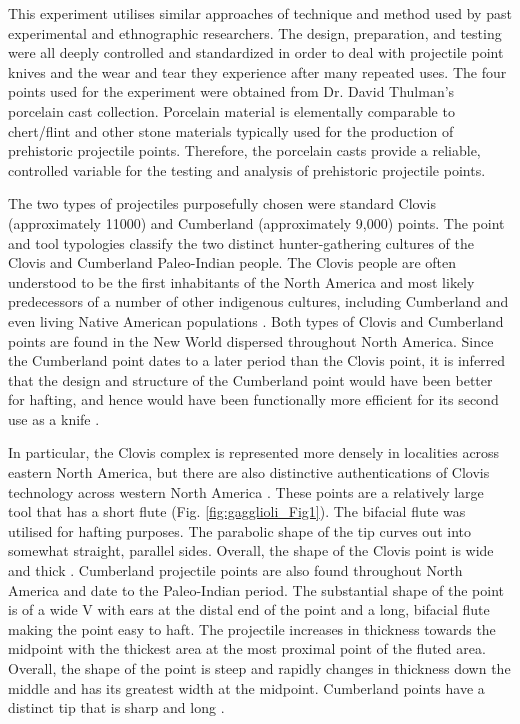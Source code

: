 	 This experiment utilises similar approaches of technique and method used by past experimental and ethnographic researchers. The design, preparation, and testing were all deeply controlled and standardized in order to deal with projectile point knives and the wear and tear they experience after many repeated uses. The four points used for the experiment were obtained from Dr. David Thulman’s porcelain cast collection. Porcelain material is elementally comparable to chert/flint and other stone materials typically used for the production of prehistoric projectile points. Therefore, the porcelain casts provide a reliable, controlled variable for the testing and analysis of prehistoric projectile points. 
	 
	 The two types of projectiles purposefully chosen were standard Clovis (approximately 11000\BC) and Cumberland (approximately 9,000\BC) points. The point and tool typologies classify the two distinct hunter-gathering cultures of the Clovis and Cumberland Paleo-Indian people. The Clovis people are often understood to be the first inhabitants of the North America and most likely predecessors of a number of other indigenous cultures, including Cumberland and even living Native American populations \parencite{Haynes_2002}. Both types of Clovis and Cumberland points are found in the New World dispersed throughout North America. Since the Cumberland point dates to a later period than the Clovis point, it is inferred that the design and structure of the Cumberland point would have been better for hafting, and hence would have been functionally more efficient for its second use as a knife \parencite{Anderson_2010}.
	 
	 In particular, the Clovis complex is represented more densely in localities across eastern North America, but there are also distinctive authentications of Clovis technology across western North America \parencite{Morrow_1995}. These points are a relatively large tool that has a short flute (Fig. \ref{fig:gagglioli_Fig1}). The bifacial flute was utilised for hafting purposes. The parabolic shape of the tip curves out into somewhat straight, parallel sides. Overall, the shape of the Clovis point is wide and thick \parencite{Anderson_2010}. Cumberland projectile points are also found throughout North America and date to the Paleo-Indian period. The substantial shape of the point is of a wide V with ears at the distal end of the point and a long, bifacial flute making the point easy to haft. The projectile increases in thickness towards the midpoint with the thickest area at the most proximal point of the fluted area. Overall, the shape of the point is steep and rapidly changes in thickness down the middle and has its greatest width at the midpoint. Cumberland points have a distinct tip that is sharp and long \parencite{Anderson_2010}.

